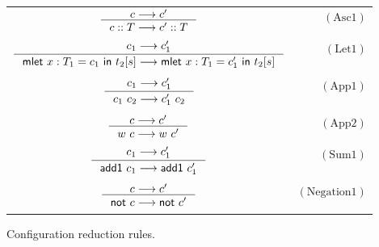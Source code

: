 \documentclass[preprint,authoryear,sort&compress,9pt,nocopyrightspace]{article}
\newcommand\rulename[1]{\mathrm{(#1)}}
\newcommand{\tto}{\longrightarrow}
\newcommand{\ascrip}[1]{#1::T}
\newcommand{\oletP}[3]{\mathsf{mlet} \ x : #1 = #2 \ \mathsf{in}  \ #3}
\newcommand{\negacion}[1]{\mathsf{not} \ #1}
\newcommand{\suma}[1]{\mathsf{add1} \ #1}
\begin{document}
\begin{figure}
\begin{small}
\begin{center}
\begin{tabular}{|c r|}
$ \inference {c \tto c'}{\ascrip{c} \tto \ascrip{c'} }$&$\rulename{Asc1} $\\
&\\
$ \inference {c_1 \tto c_1'}{\oletP{T_1}{c_1}{t_2[s]} \tto \oletP{T_1}{c_1'}{t_2[s]} }$&$\rulename{Let1} $\\
&\\
$\inference {c_1 \tto c_1'}{c_1 \ c_2 \tto c_1' \ c_2} $&$\rulename{App1}  $\\
&\\
$ \inference {c \tto c'}{w \ c \tto w \ c'}$&$\rulename{App2}  $\\
&\\
$\inference {c_1 \tto c_1'}{\suma{c_1} \tto \suma{c_1'}} $&$\rulename{Sum1}  $\\
&\\
$ \inference {c \tto c'}{\negacion{c} \tto \negacion{c'}}$&$\rulename{Negation1}  $\\
&\\
\hline
\end{tabular}
\caption{Configuration reduction rules.}
\label{tabla:sencilla}
\end{center}
\end{small}
\end{figure}
\end{document}
